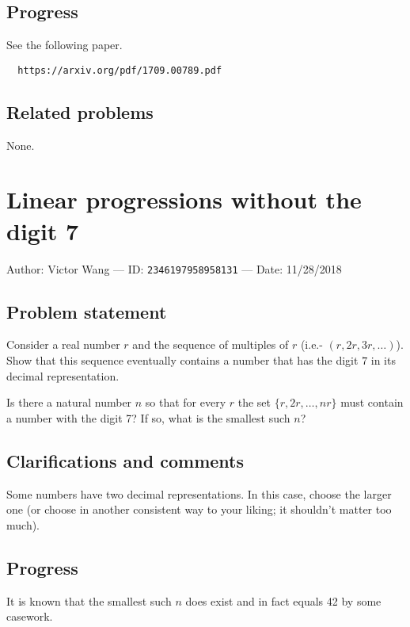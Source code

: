 \documentclass[10pt]{article}
\begin{document}
\subsection{Progress}

See the following paper.

\begin{verbatim}
  https://arxiv.org/pdf/1709.00789.pdf
\end{verbatim}

\subsection{Related problems}

None.

\pagebreak

\section{Linear progressions without the digit 7}

Author: Victor Wang --- ID: \verb`2346197958958131` --- Date: 11/28/2018

\subsection{Problem statement}

Consider a real number $r$ and the sequence of multiples of $r$ (i.e.- $(r,2r,3r,\ldots)$). Show that this sequence eventually contains a number that has the digit $7$ in its decimal representation.

Is there a natural number $n$ so that for every $r$ the set $\{r,2r,\ldots,nr\}$ must contain a number with the digit 7? If so, what is the smallest such $n$?

\subsection{Clarifications and comments}

Some numbers have two decimal representations. In this case, choose the larger one (or choose in another consistent way to your liking; it shouldn't matter too much).

\subsection{Progress}

It is known that the smallest such $n$ does exist and in fact equals 42 by some casework.
\end{document}
